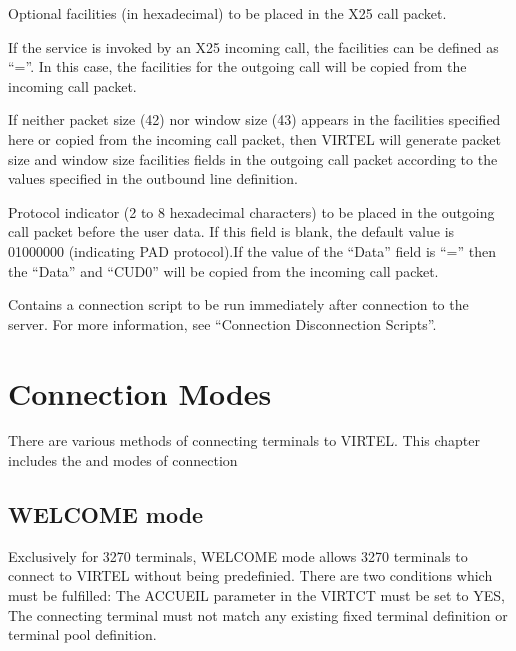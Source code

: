 \documentclass[letterpaper,10pt,english]{sphinxmanual}
\begin{document}
\begin{description}
\sphinxAtStartPar
Optional facilities (in hexadecimal) to be placed in the X25 call packet.

\sphinxAtStartPar
If the service is invoked by an X25 incoming call, the facilities can be defined as “=”. In this case, the facilities for the outgoing call will be copied from the incoming call packet.

\sphinxAtStartPar
If neither packet size (42) nor window size (43) appears in the facilities specified here or copied from the incoming call packet, then VIRTEL will generate packet size and window size facilities fields in the outgoing call packet according to the values specified in the outbound line definition.

\sphinxAtStartPar
Protocol indicator (2 to 8 hexadecimal characters) to be placed in the outgoing call packet before the user data. If this field is blank, the default value is 01000000 (indicating PAD protocol).If the value of the “Data” field is “=” then the “Data” and “CUD0” will be copied from the incoming call packet.

\sphinxAtStartPar
Contains a connection script to be run immediately after connection to the server. For more information, see “Connection \textendash{} Disconnection Scripts”.

\end{description}

\ignorespaces 

\chapter{Connection Modes}
\label{\detokenize{connectivity_guide:connection-modes}}\label{\detokenize{connectivity_guide:index-138}}
\sphinxAtStartPar
There are various methods of connecting terminals to VIRTEL. This chapter includes the  and  modes of connection

\ignorespaces 

\section{WELCOME mode}
\label{\detokenize{connectivity_guide:welcome-mode}}\label{\detokenize{connectivity_guide:index-139}}
\sphinxAtStartPar
Exclusively for 3270 terminals, WELCOME mode allows 3270 terminals to connect to VIRTEL without being predefinied.
There are two conditions which must be fulfilled:
\sphinxhyphen{} The ACCUEIL parameter in the VIRTCT must be set to YES,
\sphinxhyphen{} The connecting terminal must not match any existing fixed terminal definition or terminal pool definition.
\end{document}
